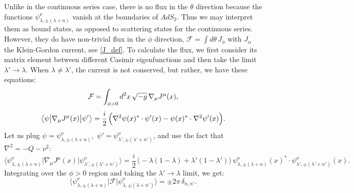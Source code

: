 \documentclass[11pt]{article}
\newcommand{\blangle}{\bigl\langle}
\newcommand{\brangle}{\bigr\rangle}
\newcommand*{\bbra}[1]{\blangle{#1}\big|}
\newcommand*{\bket}[1]{\big|{#1}\brangle}
\newcommand{\calF}{\mathcal{F}}
\DeclareMathOperator{\AdS}{AdS}
\newcommand{\tht}{\theta}
\newcommand{\lam}{\lambda}
\def\AdS{AdS}
\begin{document}
Unlike in the continuous series case, there is no flux in the $\theta$ direction because the functions $\psi^{\nu}_{\lam,\pm(\lam+n)}$ vanish at the boundaries of $\AdS_2$. Thus we may interpret them as bound states, as opposed to scattering states for the continuous series. However, they do have non-trivial flux in the $\phi$ direction, $\calF=\int d\tht \, J_{\phi}$ with $J_{\alpha}$ the Klein-Gordon current, see \eqref{J_def}. To calculate the flux, we first consider its matrix element between different Casimir eigenfunctions and then take the limit $\lambda'\to\lambda$. When $\lambda\not=\lambda'$, the current is not conserved, but rather, we have these equations:
\begin{gather}
\calF=\int_{\phi>0} d^{2}x\,\sqrt{-g}\,\nabla_{\mu}J^{\mu}(x),
\\[3pt]
\bbra{\psi}\nabla_{\mu}J^{\mu}(x)\bket{\psi'}
=\frac{i}{2}\,\Bigl(\nabla^{2}\psi(x)^{*}\cdot\psi'(x)
-\psi(x)^{*}\cdot\nabla^{2}\psi'(x)\Bigr).
\end{gather}
Let us plug $\psi=\psi^{\nu}_{\lam,\pm(\lam+n)}$,\, $\psi'=\psi^{\nu}_{\lam',\pm(\lam'+n')}$, and use the fact that $\nabla^2=-Q-\nu^2$:
\begin{equation}
\bbra{\psi^{\nu}_{\lam,\pm(\lam+n)}}\nabla_{\mu}J^{\mu}(x)
\bket{\psi^{\nu}_{\lam',\pm(\lam'+n')}}
=\frac{i}{2}\,\bigl(-\lambda(1-\lambda)+\lambda'(1-\lambda')\bigr)\,
\psi^{\nu}_{\lam,\pm(\lam+n)}(x)^{*}\cdot\psi^{\nu}_{\lam',\pm(\lam'+n')}(x).
\end{equation}
Integrating over the $\phi>0$ region and taking the $\lambda'\to\lambda$ limit, we get:
\begin{equation}
\bbra{\psi^{\nu}_{\lam,\pm(\lam+n)}}\calF
\bket{\psi^{\nu}_{\lam,\pm(\lam+n')}}
=\pm 2\pi\,\delta_{n,n'}.
\end{equation}
\end{document}
